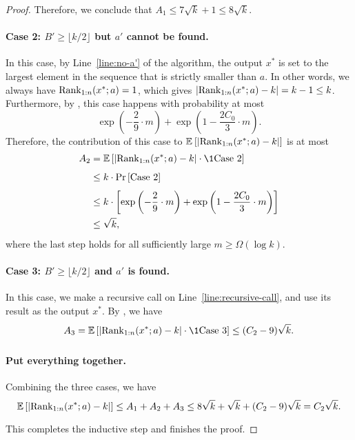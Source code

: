\begin{proof}
Therefore, we conclude that $A_1
\le 7\sqrt{k} + 1 \le 8\sqrt{k}$.
     
\paragraph{Case 2: $B' \ge \lfloor k/2\rfloor$ but $a'$ cannot be found.} In this case, by Line~\ref{line:no-a'} of the algorithm, the output $x^*$ is set to the largest element in the sequence that is strictly smaller than $a$. In other words, we always have $\mathrm{Rank}_{1:n}(x^*; a) = 1$, which gives $|\mathrm{Rank}_{1:n}(x^*; a) - k| = k - 1 \le k$. Furthermore, by , this case happens with probability at most
\[
    \exp\left(-\frac{2}{9}\cdot m\right) + \exp\left(1-\frac{2C_0}{3}\cdot m\right).
\]
Therefore, the contribution of this case to $\operatorname*{\mathbb{E}}_{}\left[|\mathrm{Rank}_{1:n}(x^*; a) - k|\right]$ is at most
\begin{align*}
    A_2
&=  \Ex{}{|\rank_{1:n}(x^*; a) - k| \cdot \1{\text{Case 2}}}\\
&\le k\cdot \pr{}{\text{Case 2}}\\
&\le k\cdot\left[\exp\left(-\frac{2}{9}\cdot m\right) + \exp\left(1-\frac{2C_0}{3}\cdot m\right)\right]\\
&\le \sqrt{k},
\end{align*}
where the last step holds for all sufficiently large $m \ge \Omega(\log k)$.
     
\paragraph{Case 3: $B' \ge \lfloor k/2 \rfloor$ and $a'$ is found.} In this case, we make a recursive call on Line~\ref{line:recursive-call}, and use its result as the output $x^*$. By , we have
\[
    A_3 = \Ex{}{\left|\rank_{1:n}(x^*; a) - k\right|\cdot\1{\text{Case 3}}} \le (C_2 - 9)\sqrt{k}.
\]       

\paragraph{Put everything together.} Combining the three cases, we have
\[
    \operatorname*{\mathbb{E}}_{}\left[\left| \mathrm{Rank}_{1:n}(x^*; a) - k\right|\right]
\le A_1 + A_2 + A_3
\le 8\sqrt{k} + \sqrt{k} + (C_2 - 9)\sqrt{k}
=   C_2\sqrt{k}.
\]
This completes the inductive step and finishes the proof.
\end{proof}